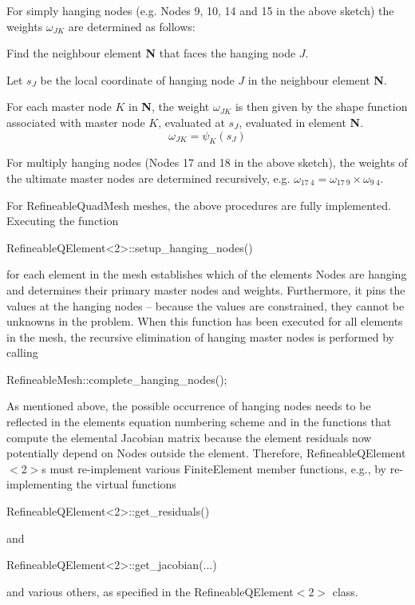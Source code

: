 For simply hanging nodes (e.\+g. {\ttfamily Nodes} 9, 10, 14 and 15 in the above sketch) the weights $ \omega_{JK} $ are determined as follows\+:
\begin{DoxyItemize}
\item Find the neighbour element {\bfseries N} that faces the hanging node $ J $.
\item Let $ s_J $ be the local coordinate of hanging node $ J $ in the neighbour element {\bfseries N}.
\item For each master node $ K $ in {\bfseries N}, the weight $ \omega_{JK} $ is then given by the shape function associated with master node $ K $, evaluated at $ s_J $, evaluated in element {\bfseries N}. \[ \omega_{JK} = \psi_K(s_J) \]
\end{DoxyItemize}For multiply hanging nodes ({\ttfamily Nodes} 17 and 18 in the above sketch), the weights of the ultimate master nodes are determined recursively, e.\+g. $ \omega_{17\ 4} = \omega_{17\ 9} \times \omega_{9 \ 4}. $

For {\ttfamily Refineable\+Quad\+Mesh} meshes, the above procedures are fully implemented. Executing the function 
\begin{DoxyCode}
RefineableQElement<2>::setup\_hanging\_nodes() 
\end{DoxyCode}
 for each element in the mesh establishes which of the elements\textquotesingle{} {\ttfamily Nodes} are hanging and determines their primary master nodes and weights. Furthermore, it pins the values at the hanging nodes -- because the values are constrained, they cannot be unknowns in the problem. When this function has been executed for all elements in the mesh, the recursive elimination of hanging master nodes is performed by calling 
\begin{DoxyCode}
RefineableMesh::complete\_hanging\_nodes(); 
\end{DoxyCode}


As mentioned above, the possible occurrence of hanging nodes needs to be reflected in the element\textquotesingle{}s equation numbering scheme and in the functions that compute the elemental Jacobian matrix because the element residuals now potentially depend on {\ttfamily Nodes} outside the element. Therefore, {\ttfamily Refineable\+Q\+Element$<$2$>$s} must re-\/implement various {\ttfamily Finite\+Element} member functions, e.\+g., by re-\/implementing the virtual functions 
\begin{DoxyCode}
RefineableQElement<2>::get\_residuals() 
\end{DoxyCode}
 and 
\begin{DoxyCode}
RefineableQElement<2>::get\_jacobian(...) 
\end{DoxyCode}
 and various others, as specified in the {\ttfamily Refineable\+Q\+Element$<$2$>$} class.


